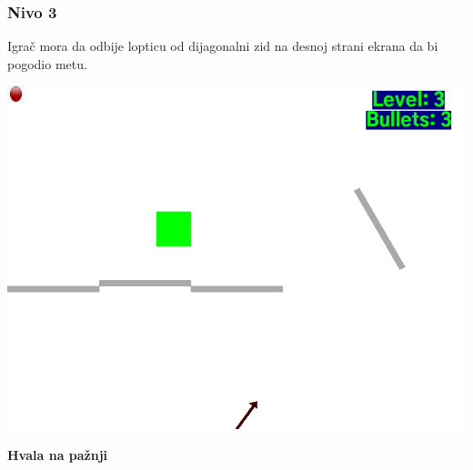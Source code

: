 \documentclass{beamer}
\begin{document}
\begin{frame}
	\frametitle{Nivo 3}
	\Large
	Igrač mora da odbije lopticu od dijagonalni zid na desnoj strani ekrana da bi pogodio metu.
	
	\vspace{0.5cm}
	
	\begin{center}
		\includegraphics[scale=0.25]{./images/lvl3.png}
	\end{center}
\end{frame}
\begin{frame}
	\begin{center}
		\Huge
		\textbf{Hvala na pažnji}
	\end{center}
\end{frame}
\end{document}
